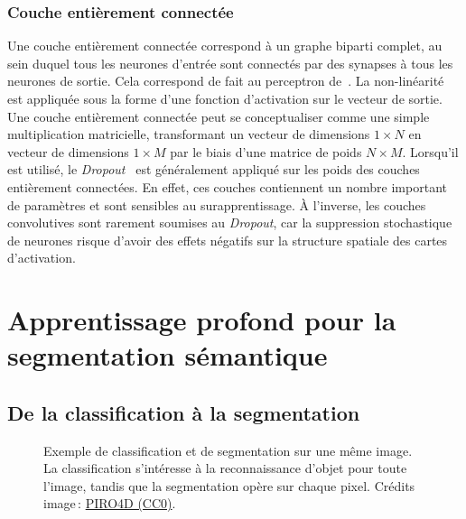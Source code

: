 \subsubsection{Couche entièrement connectée}

Une couche entièrement connectée correspond à un graphe biparti complet, au sein duquel tous les neurones d'entrée sont connectés par des synapses à tous les neurones de sortie. Cela correspond de fait au perceptron de~\citet{rosenblatt_perceptron_1957}. La non-linéarité est appliquée sous la forme d'une fonction d'activation sur le vecteur de sortie. Une couche entièrement connectée peut se conceptualiser comme une simple multiplication matricielle, transformant un vecteur de dimensions $1\times{}N$ en vecteur de dimensions $1\times{}M$ par le biais d'une matrice de poids $N\times{}M$. Lorsqu'il est utilisé, le \emph{Dropout}~\cite{srivastava_dropout_2014} est généralement appliqué sur les poids des couches entièrement connectées. En effet, ces couches contiennent un nombre important de paramètres et sont sensibles au surapprentissage. À l'inverse, les couches convolutives sont rarement soumises au \emph{Dropout}, car la suppression stochastique de neurones risque d'avoir des effets négatifs sur la structure spatiale des cartes d'activation.

\section{Apprentissage profond pour la segmentation sémantique}

\subsection{De la classification à la segmentation}

\begin{figure}[t]
  \resizebox{\textwidth}{!}{}
  \caption{Exemple de classification et de segmentation sur une même image. La classification s'intéresse à la reconnaissance d'objet pour toute l'image, tandis que la segmentation opère sur chaque pixel. {\small Crédits image\,: \href{https://pixabay.com/en/balloon-hot-air-balloon-ride-mission-2331488/}{PIRO4D (CC0)}}.}
  \label{fig:classif_vs_seg}
\end{figure}

